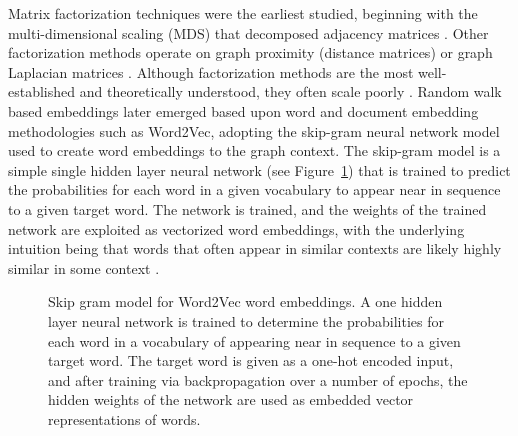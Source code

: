 \documentclass[
  super,
  preprint,
  3p]{elsarticle}
\begin{document}
Matrix factorization techniques were the earliest studied, beginning
with the multi-dimensional scaling (MDS) that decomposed adjacency
matrices \citep{RN34}. Other factorization methods operate on graph
proximity (distance matrices) or graph Laplacian matrices
\citep{RN35, RN36}. Although factorization methods are the most
well-established and theoretically understood, they often scale poorly
\citep{xu_understanding_2020}. Random walk based embeddings
\citep{perozzi_deepwalk_2014} later emerged based upon word and document
embedding methodologies such as Word2Vec, adopting the skip-gram neural
network model used to create word embeddings to the graph context. The
skip-gram model is a simple single hidden layer neural network (see
Figure~\ref{fig-skip}) that is trained to predict the probabilities for
each word in a given vocabulary to appear near in sequence to a given
target word. The network is trained, and the weights of the trained
network are exploited as vectorized word embeddings, with the underlying
intuition being that words that often appear in similar contexts are
likely highly similar in some context \citep{mikolov_efficient_2013}.

\begin{figure}


\caption{\label{fig-skip}Skip gram model for Word2Vec word embeddings. A
one hidden layer neural network is trained to determine the
probabilities for each word in a vocabulary of appearing near in
sequence to a given target word. The target word is given as a one-hot
encoded input, and after training via backpropagation over a number of
epochs, the hidden weights of the network are used as embedded vector
representations of words.}

\end{figure}%
\end{document}
